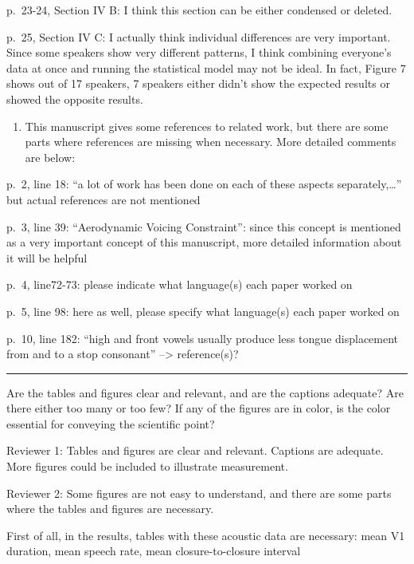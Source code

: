 \documentclass[]{article}
\providecommand{\tightlist}{%
  \setlength{\itemsep}{0pt}\setlength{\parskip}{0pt}}
\begin{document}
p.~23-24, Section IV B: I think this section can be either condensed or
deleted.

p.~25, Section IV C: I actually think individual differences are very
important. Since some speakers show very different patterns, I think
combining everyone's data at once and running the statistical model may
not be ideal. In fact, Figure 7 shows out of 17 speakers, 7 speakers
either didn't show the expected results or showed the opposite results.

\begin{enumerate}
\def\labelenumi{\arabic{enumi}.}
\setcounter{enumi}{1}
\tightlist
\item
  This manuscript gives some references to related work, but there are
  some parts where references are missing when necessary. More detailed
  comments are below:
\end{enumerate}

p.~2, line 18: ``a lot of work has been done on each of these aspects
separately,\ldots{}'' but actual references are not mentioned

p.~3, line 39: ``Aerodynamic Voicing Constraint'': since this concept is
mentioned as a very important concept of this manuscript, more detailed
information about it will be helpful

p.~4, line72-73: please indicate what language(s) each paper worked on

p.~5, line 98: here as well, please specify what language(s) each paper
worked on

p.~10, line 182: ``high and front vowels usually produce less tongue
displacement from and to a stop consonant'' --\textgreater{}
reference(s)?

\par

\noindent

\rule{\textwidth}{0.4pt}

Are the tables and figures clear and relevant, and are the captions
adequate? Are there either too many or too few? If any of the figures
are in color, is the color essential for conveying the scientific point?

Reviewer 1: Tables and figures are clear and relevant. Captions are
adequate. More figures could be included to illustrate measurement.

Reviewer 2: Some figures are not easy to understand, and there are some
parts where the tables and figures are necessary.

First of all, in the results, tables with these acoustic data are
necessary: mean V1 duration, mean speech rate, mean closure-to-closure
interval
\end{document}
